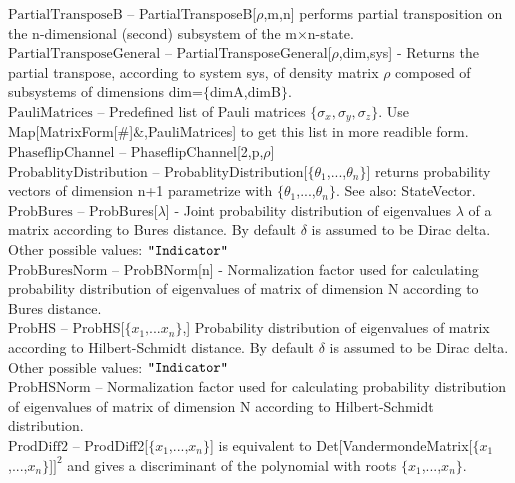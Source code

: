 \documentclass[a4paper,10pt]{scrartcl}
\begin{document}
\textbf{$ \text{PartialTransposeB} $ }-- PartialTransposeB[$\rho $,m,n] performs partial transposition on the n-dimensional (second) subsystem of the m$\times $n-state.$  $\\

\textbf{$ \text{PartialTransposeGeneral} $ }-- PartialTransposeGeneral[$\rho $,dim,sys] - Returns the partial transpose, according to system sys, of density matrix $\rho $ composed of subsystems of dimensions dim=$\{$dimA,dimB$\}$. $  $\\

\textbf{$ \text{PauliMatrices} $ }-- Predefined list of Pauli matrices $\{$$ \sigma _x,\sigma _y,\sigma _z $$\}$. Use Map[MatrixForm[$\#$]$\&$,PauliMatrices] to get this list in more readible form.$  $\\

\textbf{$ \text{PhaseflipChannel} $ }-- PhaseflipChannel[2,p,$\rho $]$  $\\

\textbf{$ \text{ProbablityDistribution} $ }-- ProbablityDistribution[$\{$$ \theta _1 $,...,$ \theta _n $$\}$] returns probability vectors of dimension n+1 parametrize with $\{$$ \theta _1 $,...,$ \theta _n $$\}$. See also: StateVector.$  $\\

\textbf{$ \text{ProbBures} $ }-- ProbBures[$\lambda $] - Joint probability distribution of eigenvalues $\lambda $ of a matrix according to Bures distance. By default $\delta $ is assumed to be Dirac delta. Other possible values: $\texttt{"$ $Indicator$\texttt{"}$} $\\

\textbf{$ \text{ProbBuresNorm} $ }-- ProbBNorm[n] - Normalization factor used for calculating probability distribution of eigenvalues of matrix of dimension N according to Bures distance.$  $\\

\textbf{$ \text{ProbHS} $ }-- ProbHS[$\{$$ x_1\text{,...}x_n $$\}$,] Probability distribution of eigenvalues of matrix according to Hilbert-Schmidt distance. By default $\delta $ is assumed to be Dirac delta. Other possible values: $\texttt{"$ $Indicator$\texttt{"}$} $\\

\textbf{$ \text{ProbHSNorm} $ }-- Normalization factor used for calculating probability distribution of eigenvalues of matrix of dimension N according to Hilbert-Schmidt distribution.$  $\\

\textbf{$ \text{ProdDiff2} $ }-- ProdDiff2[$\{$$ x_1 $,...,$ x_n $$\}$] is equivalent to Det[VandermondeMatrix[$\{$$ x_1 $,...,$ x_n $$\}$]$ ]^2 $ and gives a discriminant of the polynomial with roots $\{$$ x_1 $,...,$ x_n $$\}$.$  $\\
\end{document}
